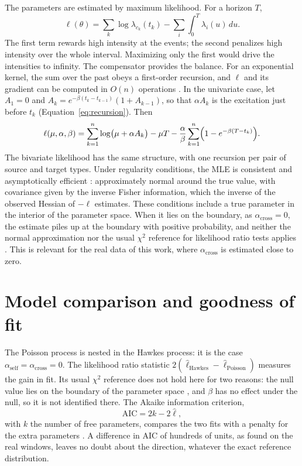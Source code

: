 The parameters are estimated by maximum likelihood. For a horizon \(T\),
\[
 \ell(\theta)=\sum_k\log\lambda_{c_k}(t_k)
 -\sum_i\int_0^T\lambda_i(u)\,du.
\]
The first term rewards high intensity at the events; the second penalizes high
intensity over the whole interval. Maximizing only the first would drive the
intensities to infinity. The compensator provides the balance. For an exponential
kernel, the sum over the past obeys a first-order recursion, and \(\ell\) and its
gradient can be computed in \(O(n)\) operations \citep{ozaki1979}. In the univariate case,
let \(A_1=0\) and \(A_k=e^{-\beta(t_k-t_{k-1})}(1+A_{k-1})\), so that \(\alpha A_k\) is
the excitation just before \(t_k\) (Equation~\eqref{eq:recursion}). Then
\begin{equation}
 \ell(\mu,\alpha,\beta)=\sum_{k=1}^{n}\log\bigl(\mu+\alpha A_k\bigr)-\mu T
 -\frac{\alpha}{\beta}\sum_{k=1}^{n}\Bigl(1-e^{-\beta(T-t_k)}\Bigr).
 \label{eq:loglik1d}
\end{equation}
The bivariate likelihood has the same structure, with one recursion per pair of source and
target types. Under regularity conditions, the MLE is consistent and asymptotically
efficient \citep{ogata1978}: approximately normal around the true value, with covariance
given by the inverse Fisher information, which the inverse of the observed Hessian of
\(-\ell\) estimates. These conditions include a true parameter in the interior of the
parameter space. When it lies on the boundary, as \(\alpha_{\mathrm{cross}}=0\), the
estimate piles up at the boundary with positive probability, and neither the normal
approximation nor the usual \(\chi^2\) reference for likelihood ratio tests applies
\citep{selfliang1987}. This is relevant for the real data of this work, where
\(\alpha_{\mathrm{cross}}\) is estimated close to zero.

\section{Model comparison and goodness of fit}

The Poisson process is nested in the Hawkes process: it is the case
\(\alpha_{\mathrm{self}}=\alpha_{\mathrm{cross}}=0\). The likelihood ratio statistic
\(2(\hat\ell_{\mathrm{Hawkes}}-\hat\ell_{\mathrm{Poisson}})\) measures the gain in fit. Its
usual \(\chi^2\) reference does not hold here for two reasons: the null value lies on the
boundary of the parameter space \citep{selfliang1987}, and \(\beta\) has no effect under the
null, so it is not identified there. The Akaike information criterion,
\[
 \mathrm{AIC}=2k-2\hat\ell,
\]
with \(k\) the number of free parameters, compares the two fits with a penalty for the extra
parameters \citep{akaike1974}. A difference in AIC of hundreds of units, as found on the real
windows, leaves no doubt about the direction, whatever the exact reference distribution.

